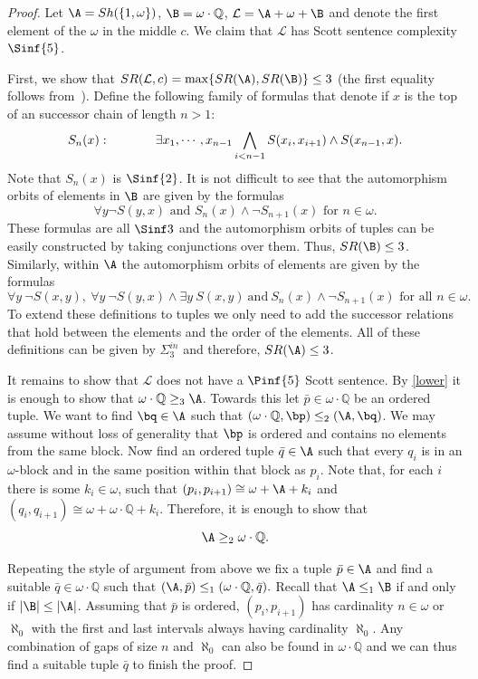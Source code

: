 \documentclass{amsart}
\newcommand{\SR}{SR}
\newcommand{\Q}{\mathbb{Q}}
\renewcommand{\L}{\mathcal{L}}
\begin{document}
\begin{proof}

Let $\A=Sh(\{1,\omega\})$, $\B=\omega\cdot\Q$, $\L=\A+\omega+\B$ and denote the
first element of the $\omega$ in the middle $c$. We claim that $\L$ has Scott
sentence complexity $\Sinf{5}$. 

First, we show that $\SR(\L,c)=\max\{\SR(\A),\SR(\B)\}\leq3$ (the first equality
follows from~\cite[Lemma 11]{GM23}). 
Define the following family of formulas that denote if $x$ is the top of an
successor chain of length $n>1$:
\[S_n(x):\hspace{.5 in} \exists x_1,\cdots,x_{n-1} \bigwedge_{i<n-1}
S(x_i,x_{i+1}) \land S(x_{n-1},x).\]
Note that $S_n(x)$ is $\Sinf{2}$. It is not difficult to see that
the automorphism orbits of elements in $\B$ are given by the formulas
\[\forall y \neg S(y,x) \text{ and } S_n(x)\land\lnot S_{n+1}(x) \text{ for }
n\in\omega.\]
These formulas are all $\Sinf 3$ and the automorphism orbits of tuples can be
easily constructed by taking conjunctions over them. Thus, $\SR(\B)\leq 3$.
Similarly, within $\A$ the automorphism orbits of elements are given by the
formulas
\[\forall y\  \neg S(x,y),\ \forall y\ \neg S(y,x) \land \exists y\ S(x,y)\
\text{and} \ S_n(x)\land\lnot S_{n+1}(x) \text{ for all $n\in\omega$}.\]
To extend these definitions to tuples we only need to add the successor relations that hold between the elements and the order of the elements.
All of these definitions can be given by $\Sigma_3^{in}$ and therefore, $\SR(\A)\leq 3$.

It remains to show that $\L$ does not have a $\Pinf{5}$ Scott sentence. 
By \cref{lower} it is enough to show that $\omega\cdot\Q\geq_3\A$.
Towards this let $\bar{p}\in \omega\cdot\Q$ be an ordered tuple. We want to find
$\bq\in \A$ such that $(\omega\cdot \Q,\bp)\leq_2(\A,\bq)$. We may assume
without loss of generality that $\bp$ is ordered and contains no elements from
the same block. Now find an
ordered tuple $\bar{q}\in \A$ such that every $q_i$ is in an $\omega$-block and
in the same position within that block as $p_i$. Note that, for each
$i$ there is some $k_i\in\omega$, such that $(p_i,p_{i+1})\cong \omega+\A+k_i$
and $(q_i,q_{i+1})\cong \omega+\omega\cdot\Q+k_i$. Therefore, it is enough to show that
\[\A\geq_2 \omega\cdot\Q.\]

Repeating the style of argument from above we fix a tuple $\bar{p}\in \A$ and
find a suitable $\bar{q}\in \omega\cdot\Q$ such that
$(\A,\bar{p})\leq_1(\omega\cdot\Q,\bar{q}).$ Recall that $\A\leq_1 \B$ if and
only if $|\B|\leq |\A|$. Assuming that $\bar{p}$ is ordered, $(p_i,p_{i+1})$ has
cardinality $n\in\omega$ or $\aleph_0$ with the first and last intervals always
having cardinality $\aleph_0$. Any combination of gaps of size $n$ and
$\aleph_0$ can also be found in $\omega\cdot\Q$ and we can thus find a suitable
tuple $\bar{q}$ to finish the proof.
\end{proof}
\end{document}
